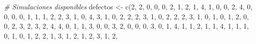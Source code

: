 \documentclass[
]{book}
\newenvironment{Shaded}{\begin{snugshade}}{\end{snugshade}}
\newcommand{\CommentTok}[1]{\textcolor[rgb]{0.56,0.35,0.01}{\textit{#1}}}
\newcommand{\DecValTok}[1]{\textcolor[rgb]{0.00,0.00,0.81}{#1}}
\newcommand{\FunctionTok}[1]{\textcolor[rgb]{0.00,0.00,0.00}{#1}}
\newcommand{\NormalTok}[1]{#1}
\newcommand{\OtherTok}[1]{\textcolor[rgb]{0.56,0.35,0.01}{#1}}
\theoremstyle{definition}
\theoremstyle{definition}
\theoremstyle{definition}
\theoremstyle{definition}
\theoremstyle{remark}
\begin{document}
\begin{Shaded}
\begin{Highlighting}[]
\CommentTok{\# Simulaciones disponibles}
\NormalTok{defectos }\OtherTok{\textless{}{-}} \FunctionTok{c}\NormalTok{(}\DecValTok{2}\NormalTok{, }\DecValTok{2}\NormalTok{, }\DecValTok{0}\NormalTok{, }\DecValTok{0}\NormalTok{, }\DecValTok{0}\NormalTok{, }\DecValTok{2}\NormalTok{, }\DecValTok{1}\NormalTok{, }\DecValTok{2}\NormalTok{, }\DecValTok{1}\NormalTok{, }\DecValTok{4}\NormalTok{, }\DecValTok{1}\NormalTok{, }\DecValTok{0}\NormalTok{, }\DecValTok{0}\NormalTok{, }\DecValTok{2}\NormalTok{, }\DecValTok{4}\NormalTok{, }
\DecValTok{0}\NormalTok{, }\DecValTok{0}\NormalTok{, }\DecValTok{0}\NormalTok{, }\DecValTok{0}\NormalTok{, }\DecValTok{1}\NormalTok{, }\DecValTok{1}\NormalTok{, }\DecValTok{1}\NormalTok{, }\DecValTok{2}\NormalTok{, }\DecValTok{2}\NormalTok{, }\DecValTok{3}\NormalTok{, }\DecValTok{1}\NormalTok{, }\DecValTok{0}\NormalTok{, }\DecValTok{4}\NormalTok{, }\DecValTok{3}\NormalTok{, }\DecValTok{1}\NormalTok{, }\DecValTok{0}\NormalTok{, }
\DecValTok{2}\NormalTok{, }\DecValTok{2}\NormalTok{, }\DecValTok{2}\NormalTok{, }\DecValTok{3}\NormalTok{, }\DecValTok{1}\NormalTok{, }\DecValTok{0}\NormalTok{, }\DecValTok{2}\NormalTok{, }\DecValTok{2}\NormalTok{, }\DecValTok{2}\NormalTok{, }\DecValTok{3}\NormalTok{, }\DecValTok{1}\NormalTok{, }\DecValTok{0}\NormalTok{, }\DecValTok{1}\NormalTok{, }\DecValTok{0}\NormalTok{, }\DecValTok{1}\NormalTok{, }\DecValTok{2}\NormalTok{, }
\DecValTok{0}\NormalTok{, }\DecValTok{0}\NormalTok{, }\DecValTok{2}\NormalTok{, }\DecValTok{3}\NormalTok{, }\DecValTok{2}\NormalTok{, }\DecValTok{3}\NormalTok{, }\DecValTok{2}\NormalTok{, }\DecValTok{4}\NormalTok{, }\DecValTok{4}\NormalTok{, }\DecValTok{0}\NormalTok{, }\DecValTok{1}\NormalTok{, }\DecValTok{1}\NormalTok{, }\DecValTok{3}\NormalTok{, }\DecValTok{0}\NormalTok{, }\DecValTok{0}\NormalTok{, }\DecValTok{3}\NormalTok{, }
\DecValTok{2}\NormalTok{, }\DecValTok{0}\NormalTok{, }\DecValTok{0}\NormalTok{, }\DecValTok{0}\NormalTok{, }\DecValTok{3}\NormalTok{, }\DecValTok{0}\NormalTok{, }\DecValTok{1}\NormalTok{, }\DecValTok{4}\NormalTok{, }\DecValTok{1}\NormalTok{, }\DecValTok{1}\NormalTok{, }\DecValTok{2}\NormalTok{, }\DecValTok{1}\NormalTok{, }\DecValTok{1}\NormalTok{, }\DecValTok{4}\NormalTok{, }\DecValTok{1}\NormalTok{, }\DecValTok{1}\NormalTok{, }
\DecValTok{1}\NormalTok{, }\DecValTok{0}\NormalTok{, }\DecValTok{1}\NormalTok{, }\DecValTok{0}\NormalTok{, }\DecValTok{1}\NormalTok{, }\DecValTok{2}\NormalTok{, }\DecValTok{2}\NormalTok{, }\DecValTok{1}\NormalTok{, }\DecValTok{3}\NormalTok{, }\DecValTok{1}\NormalTok{, }\DecValTok{2}\NormalTok{, }\DecValTok{1}\NormalTok{, }\DecValTok{2}\NormalTok{, }\DecValTok{3}\NormalTok{, }\DecValTok{1}\NormalTok{, }\DecValTok{2}\NormalTok{, }

\end{Highlighting}
\end{Shaded}
\end{document}
